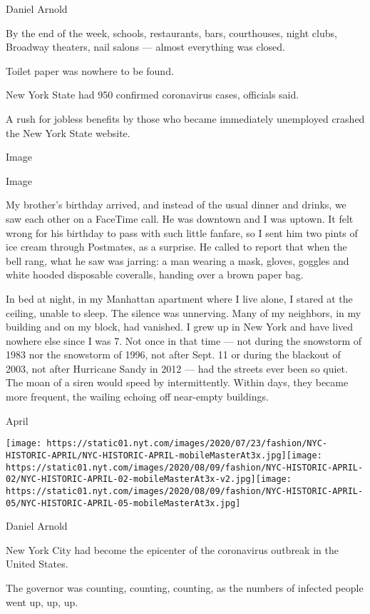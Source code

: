 Daniel Arnold

By the end of the week, schools, restaurants, bars, courthouses, night
clubs, Broadway theaters, nail salons --- almost everything was closed.

Toilet paper was nowhere to be found.

New York State had 950 confirmed coronavirus cases, officials said.

A rush for jobless benefits by those who became immediately unemployed
crashed the New York State website.

Image

Image

My brother's birthday arrived, and instead of the usual dinner and
drinks, we saw each other on a FaceTime call. He was downtown and I was
uptown. It felt wrong for his birthday to pass with such little fanfare,
so I sent him two pints of ice cream through Postmates, as a surprise.
He called to report that when the bell rang, what he saw was jarring: a
man wearing a mask, gloves, goggles and white hooded disposable
coveralls, handing over a brown paper bag.

In bed at night, in my Manhattan apartment where I live alone, I stared
at the ceiling, unable to sleep. The silence was unnerving. Many of my
neighbors, in my building and on my block, had vanished. I grew up in
New York and have lived nowhere else since I was 7. Not once in that
time --- not during the snowstorm of 1983 nor the snowstorm of 1996, not
after Sept. 11 or during the blackout of 2003, not after Hurricane Sandy
in 2012 --- had the streets ever been so quiet. The moan of a siren
would speed by intermittently. Within days, they became more frequent,
the wailing echoing off near-empty buildings.

April

\texttt{[image: https://static01.nyt.com/images/2020/07/23/fashion/NYC-HISTORIC-APRIL/NYC-HISTORIC-APRIL-mobileMasterAt3x.jpg]}\texttt{[image: https://static01.nyt.com/images/2020/08/09/fashion/NYC-HISTORIC-APRIL-02/NYC-HISTORIC-APRIL-02-mobileMasterAt3x-v2.jpg]}\texttt{[image: https://static01.nyt.com/images/2020/08/09/fashion/NYC-HISTORIC-APRIL-05/NYC-HISTORIC-APRIL-05-mobileMasterAt3x.jpg]}

Daniel Arnold

New York City had become the epicenter of the coronavirus outbreak in
the United States.

The governor was counting, counting, counting, as the numbers of
infected people went up, up, up.

